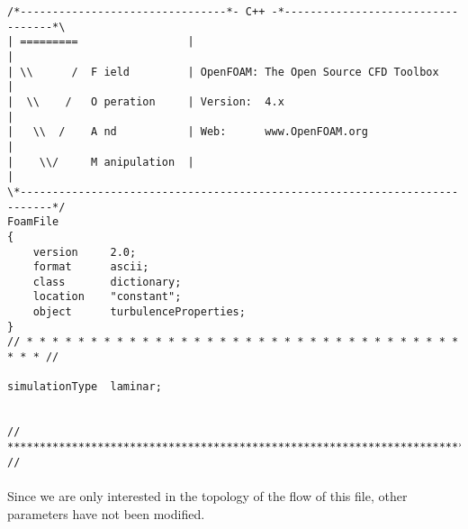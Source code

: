 \begin{footnotesize}
\begin{verbatim}
/*--------------------------------*- C++ -*----------------------------------*\
| =========                 |                                                 |
| \\      /  F ield         | OpenFOAM: The Open Source CFD Toolbox           |
|  \\    /   O peration     | Version:  4.x                                   |
|   \\  /    A nd           | Web:      www.OpenFOAM.org                      |
|    \\/     M anipulation  |                                                 |
\*---------------------------------------------------------------------------*/
FoamFile
{
    version     2.0;
    format      ascii;
    class       dictionary;
    location    "constant";
    object      turbulenceProperties;
}
// * * * * * * * * * * * * * * * * * * * * * * * * * * * * * * * * * * * * * //

simulationType  laminar;


// ************************************************************************* //
\end{verbatim}
\end{footnotesize}

\paragraph{}Since we are only interested in the topology of the flow of this file, other parameters have not been modified.